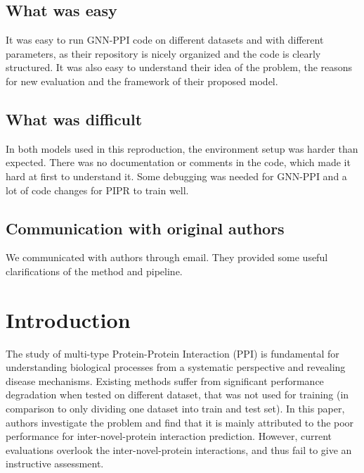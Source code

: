 \subsection*{What was easy}

It was easy to run GNN-PPI code on different datasets and with different parameters, as their repository is nicely organized and the code is clearly structured. It was also easy to understand their idea of the problem, the reasons for new evaluation and the framework of their proposed model.

\subsection*{What was difficult}

In both models used in this reproduction, the environment setup was harder than expected. There was no documentation or comments in the code, which made it hard at first to understand it. Some debugging was needed for GNN-PPI and a lot of code changes for PIPR to train well.



\subsection*{Communication with original authors}

We communicated with authors through email. They provided some useful clarifications of the method and pipeline.

\clearpage


\section{Introduction}
The study of multi-type Protein-Protein Interaction (PPI) is fundamental for understanding biological processes from a systematic perspective and revealing disease mechanisms. Existing methods suffer from significant performance degradation when tested on different dataset, that was not used for training (in comparison to only dividing one dataset into train and test set). In this paper, authors investigate the problem and find that it is mainly attributed to the poor performance for inter-novel-protein interaction prediction. However, current evaluations overlook the inter-novel-protein interactions, and thus fail to give an instructive assessment. 

